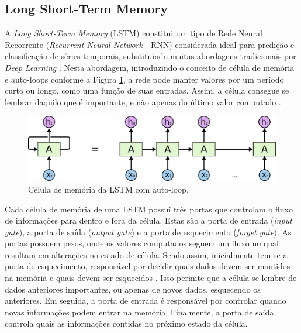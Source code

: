 \subsection{Long Short-Term Memory}

A \textit{Long Short-Term Memory} (LSTM) constitui um tipo de Rede Neural Recorrente (\textit{Recurrent Neural Network} - RNN) considerada ideal para predição e classificação de séries temporais, substituindo muitas abordagens tradicionais por \textit{Deep Learning} \cite{Zaccone2017}. Nesta abordagem, introduzindo o conceito de célula de memória e auto-loops conforme a Figura \ref{fig:cell_lstm}, a rede pode manter valores por um período curto ou longo, como uma função de suas entradas. Assim, a célula consegue se lembrar daquilo que é importante, e não apenas do último valor computado \cite{Jones2017}.

\begin{figure}[h!]
  \centering
  \caption{Célula de memória da LSTM com auto-loop.}
   \label{fig:cell_lstm}
   \includegraphics[width=1\textwidth]{figuras/fig2_3.png}
\end{figure}

Cada célula de memória de uma LSTM possuí três portas que controlam o fluxo de informações para dentro e fora da célula. Estas são a porta de entrada (\textit{input gate}), a porta de saída (\textit{output gate}) e a porta de esquecimento (\textit{forget gate}). As portas possuem pesos, onde os valores computados seguem um fluxo no qual resultam em alterações no estado de célula. Sendo assim, inicialmente tem-se a porta de esquecimento, responsável por decidir quais dados devem ser mantidos na memória e quais devem ser esquecidos \cite{Nguyen2018}. Isso permite que a célula se lembre de dados anteriores importantes, ou apenas de novos dados, esquecendo os anteriores. Em seguida, a porta de entrada é responsável por controlar quando novas informações podem entrar na memória. Finalmente, a porta de saída controla quais as informações contidas no próximo estado da célula.\cite{Jones2017}

